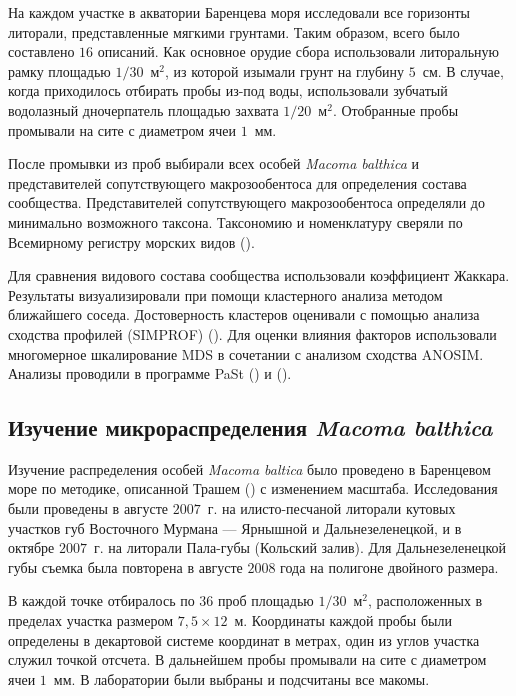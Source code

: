 На каждом участке в акватории Баренцева моря исследовали все  горизонты литорали, представленные мягкими грунтами.  
Таким образом, всего было составлено $16$ описаний.
Как основное орудие сбора использовали литоральную рамку площадью $1/30$~м$^2$, из которой изымали грунт на глубину $5$~см. 
В случае, когда приходилось отбирать пробы из-под воды, использовали зубчатый водолазный дночерпатель площадью захвата $1/20$~м$^2$.
Отобранные пробы промывали на сите с диаметром ячеи $1$~мм. 

После промывки из   проб   выбирали   всех   особей  {\it Macoma   balthica}  и   представителей   сопутствующего макрозообентоса    для   определения   состава   сообщества.
Представителей   сопутствующего макрозообентоса  определяли   до   минимально   возможного   таксона. Таксономию и номенклатуру сверяли по Всемирному регистру морских видов (\cite{WoRMS}).

Для сравнения видового состава сообщества использовали коэффициент Жаккара. 
Результаты визуализировали при помощи  кластерного анализа методом ближайшего соседа. 
Достоверность кластеров оценивали с помощью анализа сходства профилей (SIMPROF) (\cite{Clarke_et_al_2008}).
Для оценки влияния факторов использовали многомерное шкалирование MDS в сочетании с анализом сходства ANOSIM.
Анализы проводили в программе PaSt (\cite{Hammer_et_al_2001}) и \R (\cite{R_2014}).


	\subsection{Изучение микрораспределения {\it Macoma balthica}}



Изучение распределения особей {\it Macoma baltica} было проведено в Баренцевом море по методике, описанной Трашем (\cite{Thrush_et_al_1989}) с изменением масштаба.
Исследования были проведены в августе $2007$~г. на илисто-песчаной литорали кутовых участков губ Восточного Мурмана --- Ярнышной и Дальнезеленецкой, и в октябре $2007$~г. на литорали Пала-губы (Кольский залив). 
Для Дальнезеленецкой губы съемка была повторена в августе $2008$ года на полигоне двойного размера.

В каждой точке отбиралось по $36$ проб площадью $1/30$~м$^2$, расположенных в пределах участка размером $7,5 \times 12$~м. 
Координаты каждой пробы были определены в декартовой системе координат в метрах, один из углов участка служил точкой отсчета. 
В дальнейшем пробы промывали на сите с диаметром ячеи $1$~мм. 
В лаборатории были выбраны и  подсчитаны все макомы.

